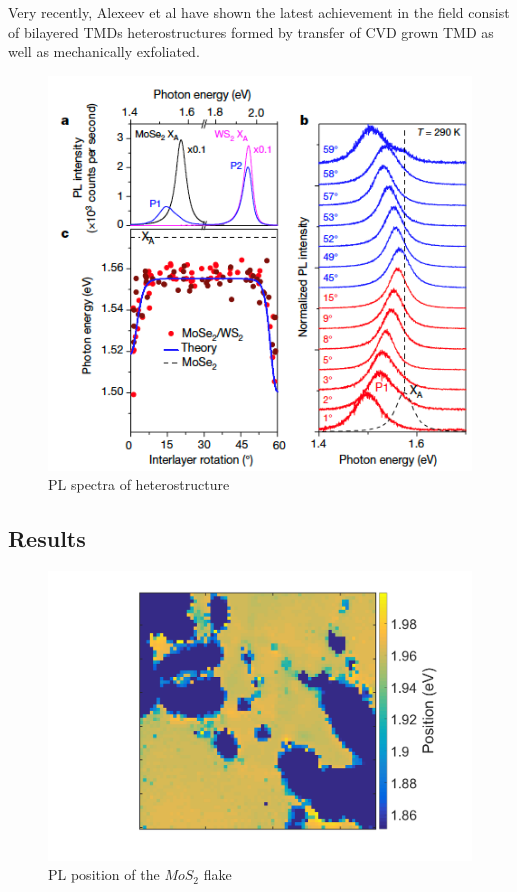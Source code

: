 Very recently, Alexeev et al \cite{Alexeev2019} have shown the latest achievement in the field consist of bilayered TMDs heterostructures formed by transfer of CVD grown TMD as well as mechanically exfoliated.

 \begin{figure}[h]
	\begin{center}
		\includegraphics[scale=1]{Heterostructures/HeterostructurePLSpectrumInterlayerTwist.png}
		\caption{PL spectra of heterostructure \cite{Alexeev2019}}
		\label{fig:HeterostructurePLSpectrumInterlayerTwist}
	\end{center}
\end{figure}

\subsection{Results}

\begin{figure}[h]
	\begin{center}
		\includegraphics[scale=0.3]{Heterostructures/PLPositionMap21.png}
		\caption{PL position of the $MoS_2$ flake}
		\label{fig:HeterostructuresPLPosition21Map}
	\end{center}
\end{figure}


